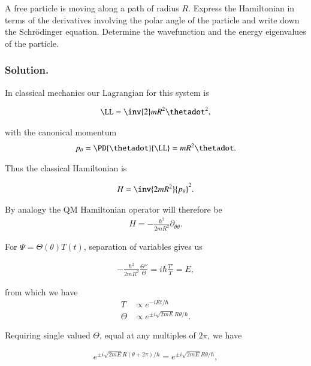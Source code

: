 A free particle is moving along a path of radius $R$.  Express the Hamiltonian in terms of the derivatives involving the polar angle of the particle and write down the Schr\"{o}dinger equation.  Determine the wavefunction and the energy eigenvalues of the particle.

\subsubsection{Solution.}

In classical mechanics our Lagrangian for this system is

\begin{align}\label{eqn:desaiCh4:500}
\LL = \inv{2} m R^2 \thetadot^2,
\end{align}

with the canonical momentum
\begin{align}\label{eqn:desaiCh4:501}
p_\theta = \PD{\thetadot}{\LL} = m R^2 \thetadot.
\end{align}

Thus the classical Hamiltonian is

\begin{align}\label{eqn:desaiCh4:502}
H = \inv{2m R^2} {p_\theta}^2.
\end{align}

By analogy the QM Hamiltonian operator will therefore be
\begin{align}\label{eqn:desaiCh4:503}
H = -\frac{\hbar^2}{2m R^2} \partial_{\theta\theta}.
\end{align}

For $\Psi = \Theta(\theta) T(t)$, separation of variables gives us

\begin{align}\label{eqn:desaiCh4:n}
-\frac{\hbar^2}{2m R^2} \frac{\Theta''}{\Theta} = i \hbar \frac{T'}{T} = E,
\end{align}

from which we have
\begin{align}\label{eqn:desaiCh4:504}
T &\propto e^{-i E t/\hbar} \\
\Theta &\propto e^{ \pm i \sqrt{2m E} R \theta/\hbar }.
\end{align}

Requiring single valued $\Theta$, equal at any multiples of $2\pi$, we have

\begin{align*}
e^{ \pm i \sqrt{2m E} R (\theta + 2\pi)/\hbar } = e^{ \pm i \sqrt{2m E} R \theta/\hbar },
\end{align*}

